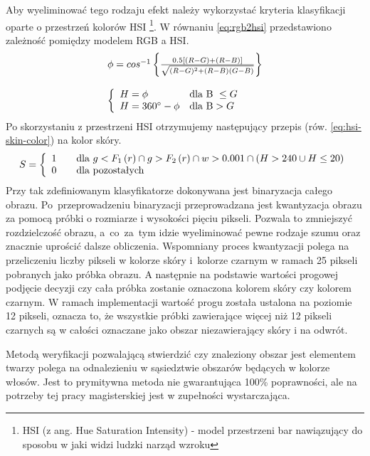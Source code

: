 Aby wyeliminować tego rodzaju efekt należy wykorzystać kryteria klasyfikacji oparte
o przestrzeń kolorów HSI \footnote{HSI (z ang. Hue Saturation Intensity) -
model przestrzeni bar nawiązujący do sposobu w jaki widzi ludzki narząd wzroku }.
W równaniu \ref{eq:rgb2hsi} przedstawiono zależność pomiędzy modelem RGB a HSI.
\begin{equation}
\label{eq:rgb2hsi}
\begin{array}{l}
\phi = cos^{-1}\left\{ \frac{0.5[(R-G)+(R-B)]}{\sqrt{(R-G)^2 + (R-B)(G-B)}}
\right\}\\\\
\left\{
\begin{array}{l l}
H=\phi & \mbox{dla B }\leq G\\
H=360^{\circ}-\phi & \mbox{dla B} > G
\end{array}
\right.
\end{array}
\end{equation}
Po skorzystaniu z przestrzeni HSI otrzymujemy następujący przepis  (rów.
\ref{eq:hsi-skin-color}) na kolor skóry.
\begin{equation}
\label{eq:hsi-skin-color}
S = \left\{ 
\begin{array}{l l}
  1 & \quad \mbox{dla $g < F_1\left(r\right) \cap g > F_2\left(r\right) \cap w
  > 0.001 \cap (H > 240 \cup H \leq 20 )$}\\ 0 & \quad \mbox{dla pozostałych}\\
  \end{array} \right.
  \label{skinEq2}
\end{equation}
Przy tak zdefiniowanym klasyfikatorze dokonywana jest binaryzacja całego obrazu.
Po~przeprowadzeniu binaryzacji przeprowadzana jest kwantyzacja obrazu za pomocą
próbki o rozmiarze i wysokości pięciu pikseli. Pozwala to zmniejszyć
rozdzielczość obrazu, a~co~za~tym idzie wyeliminować pewne rodzaje szumu oraz
znacznie uprościć dalsze obliczenia. Wspomniany proces kwantyzacji polega na
przeliczeniu liczby pikseli w kolorze skóry i~kolorze czarnym w ramach 25
pikseli pobranych jako próbka obrazu. A następnie na podstawie wartości progowej
podjęcie decyzji czy cała próbka zostanie oznaczona kolorem skóry czy kolorem
czarnym. W ramach implementacji wartość progu została ustalona na poziomie 12
pikseli, oznacza to, że wszystkie próbki zawierające więcej niż 12 pikseli
czarnych są w całości oznaczane jako obszar niezawierający skóry i na odwrót.

Metodą weryfikacji pozwalającą stwierdzić czy znaleziony obszar
jest elementem twarzy polega na odnalezieniu w sąsiedztwie obszarów będących w
kolorze włosów. Jest to prymitywna metoda nie gwarantująca 100\% poprawności,
ale na potrzeby tej pracy magisterskiej jest w zupełności wystarczająca. 

